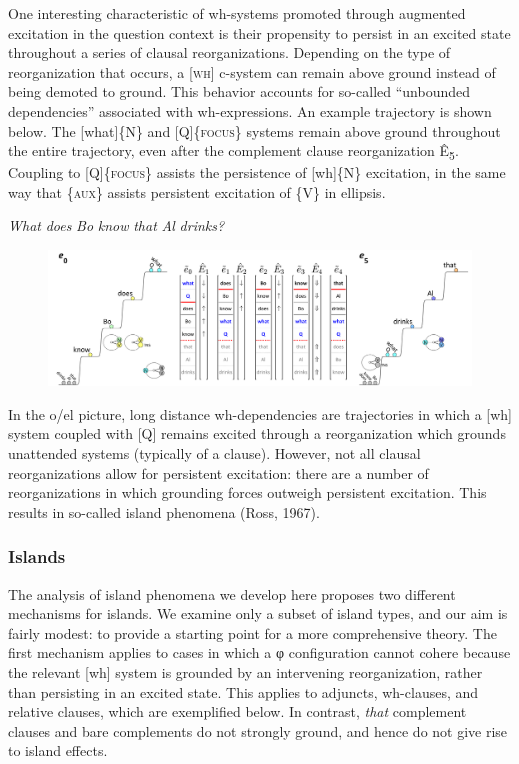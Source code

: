   One interesting characteristic of wh-systems promoted through augmented excitation in the question context is their propensity to persist in an excited state throughout a series of clausal reorganizations. Depending on the type of reorganization that occurs, a [\textsc{wh}] c-system can remain above ground instead of being demoted to ground. This behavior accounts for so-called “unbounded dependencies” associated with wh-expressions. An example trajectory is shown below. The [what]\{N\} and [Q]\{\textsc{focus}\} systems remain above ground throughout the entire trajectory, even after the complement clause reorganization Ê\textsubscript{5}. Coupling to  [Q]\{\textsc{focus}\} assists the persistence of [wh]\{N\} excitation, in the same way that \{\textsc{aux}\} assists persistent excitation of \{V\} in ellipsis. 

    \textit{What} \textit{does} \textit{Bo} \textit{know} \textit{that} \textit{Al} \textit{drinks?}

  
\begin{figure}
\includegraphics[width=\textwidth]{figures/Tilsen-img162.png}
\caption{\missingcaption}
\label{fig:}
\end{figure}
 

  In the o/el picture, long distance wh-dependencies are trajectories in which a [wh] system coupled with [Q] remains excited through a reorganization which grounds unattended systems (typically of a clause). However, not all clausal reorganizations allow for persistent excitation: there are a number of reorganizations in which grounding forces outweigh persistent excitation. This results in so-called island phenomena (Ross, 1967).

\subsubsection{Islands}

The analysis of island phenomena we develop here proposes two different mechanisms for islands. We examine only a subset of island types, and our aim is fairly modest: to provide a starting point for a more comprehensive theory. The first mechanism applies to cases in which a φ configuration cannot cohere because the relevant [wh] system is grounded by an intervening reorganization, rather than persisting in an excited state. This applies to adjuncts, wh-clauses, and relative clauses, which are exemplified below. In contrast, \textit{that} complement clauses and bare complements do not strongly ground, and hence do not give rise to island effects.

